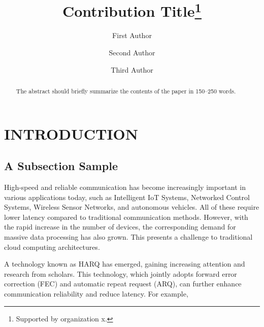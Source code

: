 \documentclass[runningheads]{llncs}
\begin{document}
%
\title{Contribution Title\thanks{Supported by organization x.}}
%
%
\author{First Author \and
Second Author \and
Third Author}
%
%
%
\maketitle              %
%
\begin{abstract}
The abstract should briefly summarize the contents of the paper in
150--250 words.

\end{abstract}
%
%
%
\section{INTRODUCTION}
\subsection{A Subsection Sample}
High-speed and reliable communication has become increasingly important in various applications today, such as Intelligent IoT Systems, Networked Control Systems, Wireless Sensor Networks, and autonomous vehicles. All of these require lower latency compared to traditional communication methods. However, with the rapid increase in the number of devices, the corresponding demand for massive data processing has also grown. This presents a challenge to traditional cloud computing architectures.

A technology known as HARQ has emerged, gaining increasing attention and research from scholars. This technology, which jointly adopts forward error correction (FEC) and automatic repeat request (ARQ), can further enhance communication reliability and reduce latency. For example,
\end{document}
